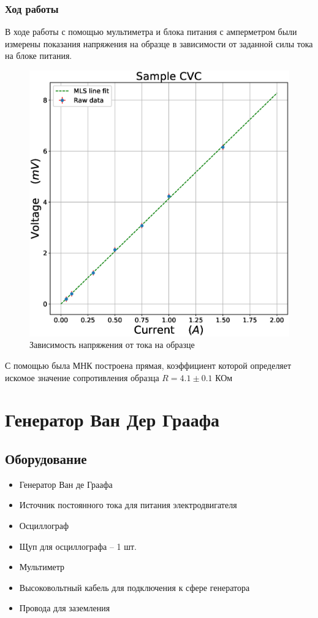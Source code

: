 \documentclass[a4paper,14pt]{extarticle}
\begin{document}
			\subsubsection{Ход работы}
				В ходе работы с помощью мультиметра и блока питания с амперметром были измерены показания напряжения на образце в зависимости от заданной силы тока на блоке питания.
				\begin{figure}[h]
					\centering
					\includegraphics[width=.80\linewidth]{Lab1_3.eps}
					\caption{Зависимость напряжения от тока на образце}
					\label{fig6}
				\end{figure}
				\newpage
				С помощью была МНК построена прямая, коэффициент которой определяет искомое значение сопротивления образца $R = 4.1 \pm 0.1$ КОм
	\section{Генератор Ван Дер Граафа}
		\subsection{Оборудование}
			\begin{itemize}
				\item Генератор Ван де Граафа 
				\item Источник постоянного тока для питания
				электродвигателя 
				\item Осциллограф 
				\item Щуп для осциллографа – 1 шт. 
				\item Мультиметр 
				\item Высоковольтный кабель для подключения к сфере генератора 
				\item Провода для заземления
			\end{itemize}
\end{document}
